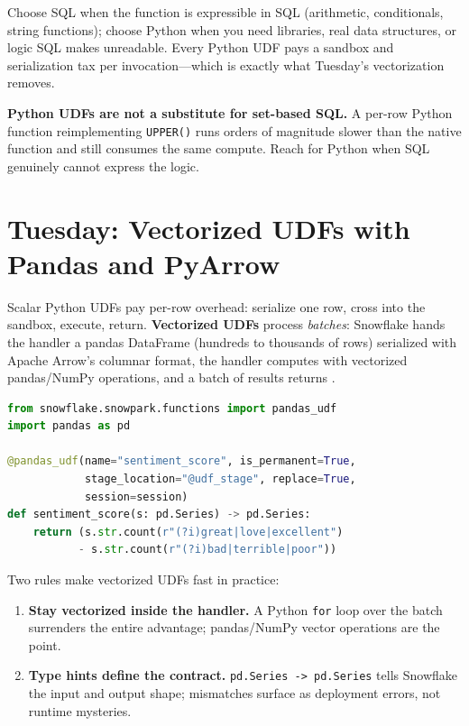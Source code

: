 Choose SQL when the function is expressible in SQL (arithmetic, conditionals, string functions); choose Python when you need libraries, real data structures, or logic SQL makes unreadable. Every Python UDF pays a sandbox and serialization tax per invocation---which is exactly what Tuesday's vectorization removes.

\begin{pitfall}
\textbf{Python UDFs are not a substitute for set-based SQL.} A per-row Python function reimplementing \texttt{UPPER()} runs orders of magnitude slower than the native function and still consumes the same compute. Reach for Python when SQL genuinely cannot express the logic.
\end{pitfall}

\section{Tuesday: Vectorized UDFs with Pandas and PyArrow}
Scalar Python UDFs pay per-row overhead: serialize one row, cross into the sandbox, execute, return. \textbf{Vectorized UDFs} process \emph{batches}: Snowflake hands the handler a pandas DataFrame (hundreds to thousands of rows) serialized with Apache Arrow's columnar format, the handler computes with vectorized pandas/NumPy operations, and a batch of results returns \cite{snowflakeAnacondaDocs,arrowDocs}.

\begin{lstlisting}[language=Python, caption={Vectorized pandas UDF for sentiment scoring}]
from snowflake.snowpark.functions import pandas_udf
import pandas as pd

@pandas_udf(name="sentiment_score", is_permanent=True,
            stage_location="@udf_stage", replace=True,
            session=session)
def sentiment_score(s: pd.Series) -> pd.Series:
    return (s.str.count(r"(?i)great|love|excellent")
           - s.str.count(r"(?i)bad|terrible|poor"))
\end{lstlisting}

Two rules make vectorized UDFs fast in practice:
\begin{enumerate}
    \item \textbf{Stay vectorized inside the handler.} A Python \texttt{for} loop over the batch surrenders the entire advantage; pandas/NumPy vector operations are the point.
    \item \textbf{Type hints define the contract.} \texttt{pd.Series -> pd.Series} tells Snowflake the input and output shape; mismatches surface as deployment errors, not runtime mysteries.
\end{enumerate}

